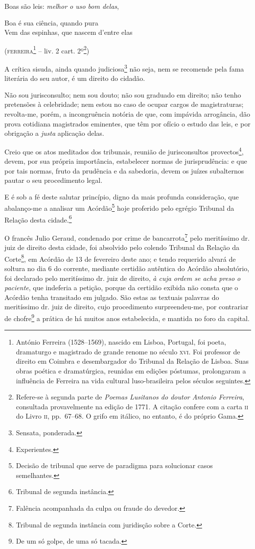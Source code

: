 \asterisc{}

Boas são leis: \emph{melhor o uso bom delas},

Boa é sua ciência, quando pura\\
Vem das espinhas, que nascem d'entre elas

(\textsc{ferreira}\footnote{ António Ferreira (1528--1569), nascido em Lisboa,
  Portugal, foi poeta, dramaturgo e magistrado de grande renome no
  século \textsc{xvi}. Foi professor de direito em Coimbra e desembargador do
  Tribunal da Relação de Lisboa. Suas obras poética e dramatúrgica,
  reunidas em edições póstumas, prolongaram a influência de Ferreira na
  vida cultural luso-brasileira pelos séculos seguintes.} -- liv. 2
cart. 2º\footnote{ Refere-se à segunda parte de \emph{Poemas Lusitanos
  do doutor Antonio Ferreira}, consultada provavelmente na edição de
  1771. A citação confere com a carta \textsc{ii} do Livro \textsc{ii}, pp.~67--68. O grifo
  em itálico, no entanto, é do próprio Gama.})

A crítica sisuda, ainda quando judiciosa\footnote{ Sensata, ponderada.}
não seja, nem se recomende pela fama literária do seu autor, é um
direito do cidadão.

Não sou jurisconsulto; nem sou douto; não sou graduado em direito; não
tenho pretensões à celebridade; nem estou no caso de ocupar cargos de
magistraturas; revolta-me, porém, a incongruência notória de que, com
impávida arrogância, dão prova cotidiana magistrados eminentes, que têm
por ofício o estudo das leis, e por obrigação a \emph{justa} aplicação
delas.

Creio que os atos meditados dos tribunais, reunião de jurisconsultos
provectos\footnote{ Experientes.}, devem, por sua própria importância,
estabelecer normas de jurisprudência: e que por tais normas, fruto da
prudência e da sabedoria, devem os juízes subalternos pautar o seu
procedimento legal.

E é sob a fé deste salutar princípio, digno da mais profunda
consideração, que abalanço-me a analisar um Acórdão\footnote{ Decisão
  de tribunal que serve de paradigma para solucionar casos semelhantes.}
hoje proferido pelo egrégio Tribunal da Relação desta cidade.\footnote{
  Tribunal de segunda instância.}

O francês Julio Geraud, condenado por crime de bancarrota\footnote{
  Falência acompanhada da culpa ou fraude do devedor.} pelo meritíssimo
dr. juiz de direito desta cidade, foi absolvido pelo colendo Tribunal da
Relação da Corte\footnote{ Tribunal de segunda instância com juridisção
  sobre a Corte.}, em Acórdão de 13 de fevereiro deste ano; e tendo
requerido alvará de soltura no dia 6 do corrente, mediante certidão
autêntica do Acórdão absolutório, foi declarado pelo meritíssimo dr.
juiz de direito, \emph{à cuja ordem se acha preso o paciente}, que
indeferia a petição, porque da certidão exibida não consta que o Acórdão
tenha transitado em julgado. São estas as textuais palavras do
meritíssimo dr. juiz de direito, cujo procedimento surpreendeu-me, por
contrariar de chofre\footnote{ De um só golpe, de uma só tacada.} a
prática de há muitos anos estabelecida, e mantida no foro da capital.

